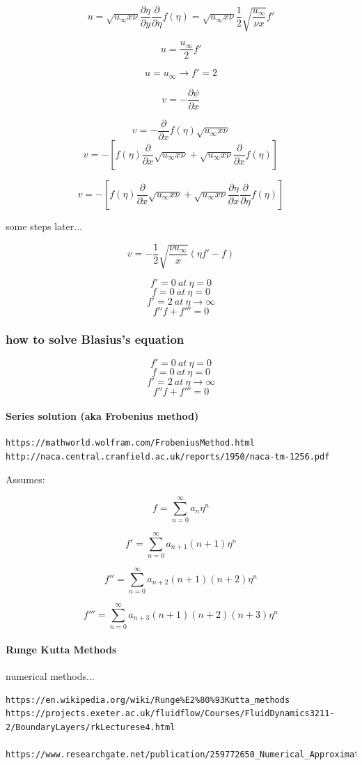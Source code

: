 \documentclass[11pt]{article}
\begin{document}
$$u =\sqrt{u_\infty x \nu} \frac{\partial \eta}{\partial y} \frac{\partial}{\partial \eta} f(\eta)= \sqrt{u_\infty x \nu}  \frac{1}{2} \sqrt{\frac{u_\infty}{\nu x}} f'$$

$$u = \frac{u_\infty}{2} f'$$

$$u = u_\infty \rightarrow f'=2$$



$$v= - \frac{\partial \psi}{\partial x}$$

$$v= - \frac{\partial}{\partial x} f(\eta) \sqrt{u_\infty x \nu}$$
$$v= -[f(\eta)\frac{\partial}{\partial x}  \sqrt{u_\infty x \nu}+  \sqrt{u_\infty x \nu} \frac{\partial}{\partial x} f(\eta)]$$

$$v= -[f(\eta)\frac{\partial}{\partial x}  \sqrt{u_\infty x \nu}+  \sqrt{u_\infty x \nu} \frac{\partial \eta}{\partial x} \frac{\partial}{\partial \eta} f(\eta)]$$

some steps later...

$$v= -\frac{1}{2} \sqrt{\frac{\nu u_\infty}{x}}(\eta f' -f)$$

$$f'=0\ at\ \eta=0$$
$$f=0\ at\ \eta=0$$
$$f' =2 \ at \ \eta\rightarrow \infty$$
$$f''f+f'''=0$$

\subsubsection{how to solve Blasius's equation}

$$f'=0\ at\ \eta=0$$
$$f=0\ at\ \eta=0$$
$$f' =2 \ at \ \eta\rightarrow \infty$$
$$f''f+f'''=0$$

\paragraph{Series solution (aka Frobenius method)}

\begin{verbatim}
https://mathworld.wolfram.com/FrobeniusMethod.html
http://naca.central.cranfield.ac.uk/reports/1950/naca-tm-1256.pdf
\end{verbatim}

Assumes:

$$f=\sum_{n=0}^\infty a_n \eta^n$$

$$f'=\sum_{n=0}^\infty a_{n+1} (n+1) \eta^n$$

$$f''=\sum_{n=0}^\infty a_{n+2} (n+1)(n+2) \eta^n$$

$$f'''=\sum_{n=0}^\infty a_{n+3} (n+1)(n+2)(n+3) \eta^n$$

\paragraph{Runge Kutta Methods}
numerical methods...
\begin{verbatim}
https://en.wikipedia.org/wiki/Runge%E2%80%93Kutta_methods 
https://projects.exeter.ac.uk/fluidflow/Courses/FluidDynamics3211-2/BoundaryLayers/rkLecturese4.html

https://www.researchgate.net/publication/259772650_Numerical_Approximations_of_Blasius_Boundary_Layer_Equation
\end{verbatim}
\end{document}
